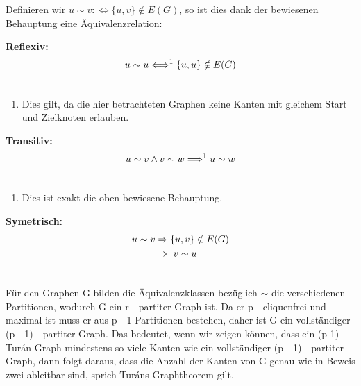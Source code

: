 \documentclass[12pt, a4paper]{article}
\begin{document}
Definieren wir $u \sim v :\Longleftrightarrow \{ u,v \} \notin E(G)$, so ist dies dank der bewiesenen Behauptung eine Äquivalenzrelation:

\textbf{Reflexiv:}
\begin{gather}
\begin{split}u \sim u \Longleftrightarrow^1 \{ u,u \} \notin E(G)\end{split}\notag\\\begin{split}\end{split}\notag
\end{gather}\begin{enumerate}
\item {}
Dies gilt, da die hier betrachteten Graphen keine Kanten mit gleichem Start und Zielknoten erlauben.

\end{enumerate}

\textbf{Transitiv:}
\begin{gather}
\begin{split}u \sim v \wedge v \sim w \Longrightarrow^1 u \sim w\end{split}\notag\\\begin{split}\end{split}\notag
\end{gather}\begin{enumerate}
\item {}
Dies ist exakt die oben bewiesene Behauptung.

\end{enumerate}

\textbf{Symetrisch:}
\begin{gather}
\begin{split}u \sim v &\Rightarrow \{ u,v \} \notin E(G) \\
&\Rightarrow\ v \sim u\end{split}\notag\\\begin{split}\end{split}\notag
\end{gather}

Für den Graphen G bilden die Äquivalenzklassen bezüglich $\sim$ die verschiedenen Partitionen, wodurch G ein r - partiter Graph ist. Da er p - cliquenfrei und maximal ist muss er aus p - 1 Partitionen bestehen, daher ist G ein vollständiger (p - 1) - partiter Graph. Das bedeutet, wenn wir zeigen können, dass ein (p-1) - Turán Graph mindestens so viele Kanten wie ein vollständiger (p - 1) - partiter Graph, dann folgt daraus, dass die Anzahl der Kanten von G genau wie in Beweis zwei ableitbar sind, sprich Turáns Graphtheorem gilt.
\end{document}

